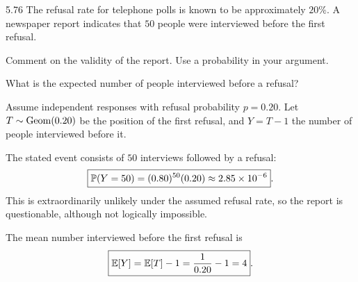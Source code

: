 \documentclass[11pt,oneside]{article}
\begin{document}
\begin{exercise}{5.76}
The refusal rate for telephone polls is known to be approximately $20\%$. A newspaper report indicates that $50$ people were interviewed before the first refusal.
\begin{exercisesubparts}
\item Comment on the validity of the report. Use a probability in your argument.
\item What is the expected number of people interviewed before a refusal?
\end{exercisesubparts}
\end{exercise}
\begin{solution}
Assume independent responses with refusal probability $p=0.20$. Let $T\sim\operatorname{Geom}(0.20)$ be the position of the first refusal, and $Y=T-1$ the number of people interviewed before it.
\begin{exercisesubparts}
\item The stated event consists of $50$ interviews followed by a refusal:
\[
\boxed{\mathbb{P}(Y=50)=(0.80)^{50}(0.20)\approx2.85\times10^{-6}}.
\]
This is extraordinarily unlikely under the assumed refusal rate, so the report is questionable, although not logically impossible.
\item The mean number interviewed before the first refusal is
\[
\boxed{\mathbb{E}[Y]=\mathbb{E}[T]-1=\frac{1}{0.20}-1=4}.
\]
\end{exercisesubparts}
\end{solution}
\end{document}
